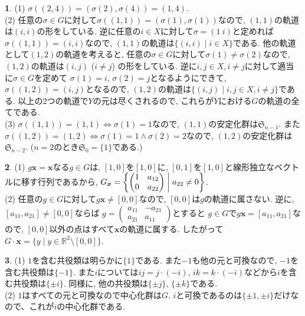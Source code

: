 \documentclass{article}
\theoremstyle{definition}
\newtheorem{ans}{}
\numberwithin{ans}{subsection}
\begin{document}
\begin{ans}
  (1) $\sigma((2, 4)) = (\sigma(2), \sigma(4)) = (1, 4)$.\\
  (2) 任意の$\sigma \in G$に対して$\sigma((1, 1)) = (\sigma(1), \sigma(1))$なので,
  $(1, 1)$の軌道は$(i, i)$の形をしている. 逆に任意の$i \in X$に対して$\sigma = (1\ i)$と定めれば
  $\sigma((1, 1)) = (i, i)$なので, $(1, 1)$の軌道は$\{(i, i) \mid i \in X\}$である.
  他の軌道として$(1, 2)$の軌道を考えると, 任意の$\sigma \in G$に対して$\sigma(1) \neq \sigma(2)$なので,
  $(1, 2)$の軌道は$(i, j)$ ($i \neq j$) の形をしている. 逆に$i, j \in X, i \neq j$に対して適当に$\sigma \in G$を定めて
  $\sigma(1) = i$, $\sigma(2) = j$となるようにできて,$\sigma((1, 2)) = (i, j)$となるので,
  $(1, 2)$の軌道は$\{(i, j) \mid i, j \in X, i \neq j\}$である.
  以上の$2$つの軌道で$Y$の元は尽くされるので, これらが$Y$における$G$の軌道の全てである.\\
  (3) $\sigma((1, 1)) = (1, 1) \Longleftrightarrow \sigma(1) = 1$なので, $(1, 1)$の安定化群は$\mathfrak{S}_{n-1}$.
  また$\sigma((1, 2)) = (1, 2) \Longleftrightarrow \sigma(1) = 1 \land \sigma(2) = 2$なので, $(1, 2)$の安定化群は$\mathfrak{S}_{n-2}$.
  ($n = 2$のとき$\mathfrak{S}_0 = \{1\}$である.)
\end{ans}

\begin{ans}
  (1) $g\bm{x} = \bm{x}$なる$g \in G$は, $[1, 0]$を$[1, 0]$に, $[0, 1]$を$[1, 0]$と線形独立なベクトルに移す行列であるから,
  $G_{\bm{x}} = \biggl\{\begin{pmatrix*}
    1 & a_{12}\\
    0 & a_{22}
  \end{pmatrix*} \biggm\vert a_{22} \neq 0\biggr\}$.\\
  (2) 任意の$g \in G$に対して$g\bm{x} \neq [0, 0]$なので,
  $[0, 0]$は$g$の軌道に属さない.
  逆に, $[a_{11}, a_{21}] \neq [0, 0]$ならば
  $g = \begin{pmatrix*}
    a_{11} & -a_{21}\\
    a_{21} & a_{11}
  \end{pmatrix*}$とすると
  $g \in G$で$g\bm{x} = [a_{11}, a_{21}]$なので,
  $[0, 0]$以外の点はすべて$\bm{x}$の軌道に属する.
  したがって$G \cdot \bm{x} = \{y \mid y \in \mathbb{R}^2\setminus[0, 0]\}$.
\end{ans}

\begin{ans}
  (1) $1$を含む共役類は明らかに$\{1\}$である.
  また$-1$も他の元と可換なので, $-1$を含む共役類は$\{-1\}$.
  また$i$については$ij = j \cdot (-i)$, $ik = k \cdot (-i)$などから$i$を含む共役類は$\{\pm i\}$.
  同様に, 他の共役類は$\{\pm j\}$, $\{\pm k\}$である.\\
  (2) $1$はすべての元と可換なので中心化群は$G$.
  $i$と可換であるのは$\{\pm 1, \pm i\}$だけなので、これが$i$の中心化群である.
\end{ans}
\end{document}
